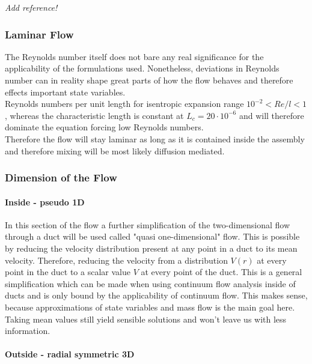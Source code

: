{\color{greenColor}\itshape
Add reference!
}

\subsubsection{Laminar Flow}

	The Reynolds number itself does not bare any real significance for the applicability of the formulations used. Nonetheless, deviations in Reynolds number can in reality shape great parts of how the flow behaves and therefore effects important state variables.\\
	Reynolds numbers per unit length for isentropic expansion range $10^{-2} < Re/l < 1$, whereas the characteristic length is constant at $L_c = 20\cdot 10^{-6}$ and will therefore dominate the equation forcing low Reynolds numbers. \cite{ames1953compressible}\\
	Therefore the flow will stay laminar as long as it is contained inside the assembly and therefore mixing will be most likely diffusion mediated.
	\cite{comsol_microfluidics_guide}
	
\subsubsection{Dimension of the Flow}

	\paragraph{Inside - pseudo 1D}

		In this section of the flow a further simplification of the two-dimensional flow through a duct will be used called "quasi one-dimensional" flow.
		This is possible by reducing the velocity distribution present at any point in a duct to its mean velocity.
		Therefore, reducing the velocity from a distribution $V(r)$ at every point in the duct to a scalar value $V$ at every point of the duct.
		This is a general simplification which can be made when using continuum flow analysis inside of ducts and is only bound by the applicability of continuum flow.
		This makes sense, because approximations of state variables and mass flow is the main goal here.
		Taking mean values still yield sensible solutions and won't leave us with less information.

	\paragraph{Outside - radial symmetric 3D}

